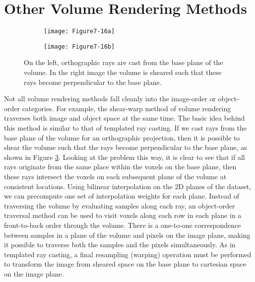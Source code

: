 \section{Other Volume Rendering Methods}

\begin{figure}[!htb]
	\begin{subfigure}[h]{0.48\linewidth}
		\texttt{[image: Figure7-16a]}
		\caption*{}\label{fig:Figure7-16a}
	\end{subfigure}
	\hfill
	\begin{subfigure}[h]{0.48\linewidth}
		\texttt{[image: Figure7-16b]}
		\caption*{}\label{fig:Figure7-16b}
	\end{subfigure}%
	\caption{On the left, orthographic rays are cast from the base plane of the volume. In the right image the volume is sheared such that these rays become perpendicular to the base plane.}\label{fig:Figure7-16}
\end{figure}

Not all volume rendering methods fall cleanly into the image-order or object-order categories. For example, the shear-warp method \cite{Lacroute94} of volume rendering traverses both image and object space at the same time. The basic idea behind this method is similar to that of templated ray casting. If we cast rays from the base plane of the volume for an orthographic projection, then it is possible to shear the volume such that the rays become perpendicular to the base plane, as shown in Figure \ref{fig:Figure7-16}. Looking at the problem this way, it is clear to see that if all rays originate from the same place within the voxels on the base plane, then these rays intersect the voxels on each subsequent plane of the volume at consistent locations. Using bilinear interpolation on the 2D planes of the dataset, we can precompute one set of interpolation weights for each plane. Instead of traversing the volume by evaluating samples along each ray, an object-order traversal method can be used to visit voxels along each row in each plane in a front-to-back order through the volume. There is a one-to-one correspondence between samples in a plane of the volume and pixels on the image plane, making it possible to traverse both the samples and the pixels simultaneously. As in templated ray casting, a final resampling (warping) operation must be performed to transform the image from sheared space on the base plane to cartesian space on the image plane.

